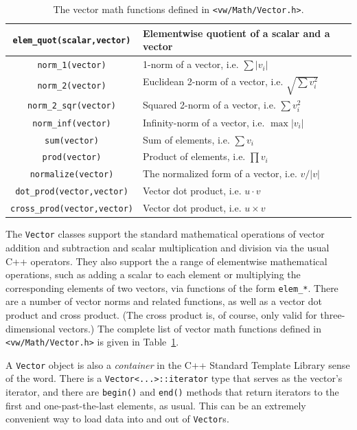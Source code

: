 \begin{table}[t!]
\begin{centering}
\begin{tabular}{|c|l|}
\verb#elem_quot(scalar,vector)# & Elementwise quotient of a scalar and a vector \\ \hline
\hline
\verb#norm_1(vector)# & 1-norm of a vector, i.e. $\sum |v_i|$ \\ \hline
\verb#norm_2(vector)# & Euclidean 2-norm of a vector, i.e. $\sqrt{\sum v_i^2}$ \\ \hline
\verb#norm_2_sqr(vector)# & Squared 2-norm of a vector, i.e. $\sum v_i^2$ \\ \hline
\verb#norm_inf(vector)# & Infinity-norm of a vector, i.e. $\max |v_i|$ \\ \hline
\verb#sum(vector)# & Sum of elements, i.e. $\sum v_i$ \\ \hline
\verb#prod(vector)# & Product of elements, i.e. $\prod v_i$ \\ \hline
\verb#normalize(vector)# & The normalized form of a vector, i.e. $v/|v|$ \\ \hline
\verb#dot_prod(vector,vector)# & Vector dot product, i.e. $u\cdot v$ \\ \hline
\verb#cross_prod(vector,vector)# & Vector dot product, i.e. $u\times v$ \\ \hline
\end{tabular}
\caption{The vector math functions defined in {\tt <vw/Math/Vector.h>}.}
\label{tbl:vector-functions}
\end{centering}\end{table}

The \verb#Vector# classes support the standard mathematical operations
of vector addition and subtraction and scalar multiplication and
division via the usual C++ operators.  They also support the a range
of elementwise mathematical operations, such as adding a scalar to
each element or multiplying the corresponding elements of two vectors,
via functions of the form \verb#elem_*#.  There are a number of vector
norms and related functions, as well as a vector dot product and cross
product.  (The cross product is, of course, only valid for
three-dimensional vectors.)  The complete list of vector math
functions defined in \verb#<vw/Math/Vector.h># is given in
Table~\ref{tbl:vector-functions}.

A \verb#Vector# object is also a {\em container} in the C++ Standard Template 
Library sense of the word.  There is a \verb#Vector<...>::iterator# type 
that serves as the vector's iterator, and there are \verb#begin()# and 
\verb#end()# methods that return iterators to the first and one-past-the-last 
elements, as usual.  This can be an extremely convenient way to load 
data into and out of \verb#Vector#s.

